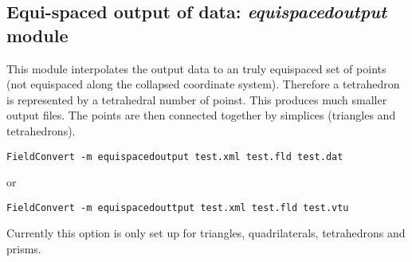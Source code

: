 \subsection{Equi-spaced output of data: \textit{equispacedoutput} module}
This module interpolates the output data to an truly equispaced set of
points (not equispaced along the collapsed coordinate
system). Therefore a tetrahedron is represented by a tetrahedral
number of poinst. This produces much smaller output files. The points
are then connected together by simplices (triangles and tetrahedrons).

\begin{lstlisting}[style=BashInputStyle]
FieldConvert -m equispacedoutput test.xml test.fld test.dat
\end{lstlisting}

or

\begin{lstlisting}[style=BashInputStyle]
FieldConvert -m equispacedouttput test.xml test.fld test.vtu
\end{lstlisting}


\begin{notebox}
Currently this option is only set up for triangles, quadrilaterals,
tetrahedrons and prisms.
\end{notebox}

